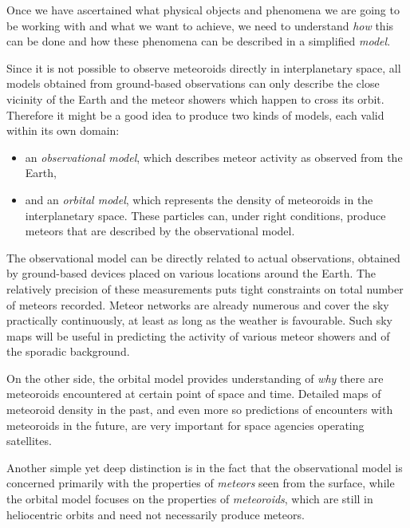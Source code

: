 
Once we have ascertained what physical objects and phenomena we are going to be working with and what we want to achieve,
we need to understand \emph{how} this can be done and how these phenomena can be described in a simplified \emph{model}.

Since it is not possible to observe meteoroids directly in interplanetary space,
all models obtained from ground-based observations can only describe the close
vicinity of the Earth and the meteor showers which happen to cross its orbit.
Therefore it might be a good idea to produce two kinds of models, each valid within its own domain:
\begin{itemize}
    \item an \emph{observational model}, which describes meteor activity as observed from the Earth,
    \item and an \emph{orbital model}, which represents the density of meteoroids in the interplanetary space.
        These particles can, under right conditions, produce meteors that are described by the observational model.
\end{itemize}

The observational model can be directly related to actual observations, obtained by ground-based
devices placed on various locations around the Earth. The relatively precision of these measurements puts
tight constraints on total number of meteors recorded. Meteor networks are already numerous
and cover the sky practically continuously, at least as long as the weather is favourable.
Such sky maps will be useful in predicting the activity of various meteor showers and of the sporadic background.

On the other side, the orbital model provides understanding of \emph{why} there are meteoroids
encountered at certain point of space and time. Detailed maps of meteoroid density in the past,
and even more so predictions of encounters with meteoroids in the future, are very important
for space agencies operating satellites.

Another simple yet deep distinction is in the fact that the observational model is concerned
primarily with the properties of \emph{meteors} seen from the surface, while the orbital model focuses
on the properties of \emph{meteoroids}, which are still in heliocentric orbits and need not necessarily produce meteors.


